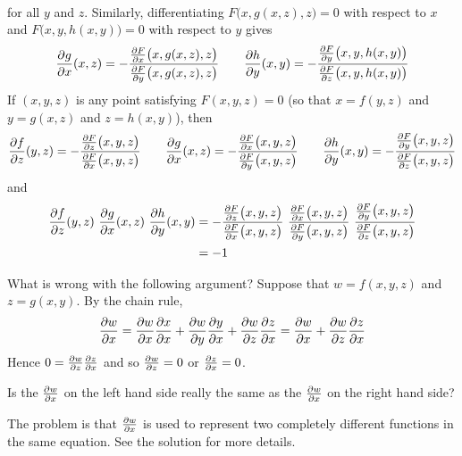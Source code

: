 \begin{solution}
\begin{align*}
\end{align*}
for all $y$ and $z$. Similarly, differentiating 
$F\big(x,g(x,z),z\big)=0$ with respect to $x$ and
$F\big(x,y,h(x,y)\big)=0$ with respect to $y$ gives
\begin{align*}
\pdiff{g}{x}(x,z)
=-\frac{\pdiff{F}{x}\big(x,g(x,z),z\big)}
{\pdiff{F}{y}\big(x,g(x,z),z\big)}\qquad
\pdiff{h}{y}(x,y)
=-\frac{\pdiff{F}{y}\big(x,y,h(x,y)\big)}
{\pdiff{F}{z}\big(x,y,h(x,y)\big)}
\end{align*}
If $(x,y,z)$ is any point satisfying $F(x,y,z)=0$ 
(so that $x=f(y,z)$ and $y=g(x,z)$ and  $z=h(x,y)$), then
\begin{align*}
\pdiff{f}{z}(y,z)
=-\frac{\pdiff{F}{z}\big(x,y,z\big)}
{\pdiff{F}{x}\big(x,y,z\big)}\qquad
\pdiff{g}{x}(x,z)
=-\frac{\pdiff{F}{x}\big(x,y,z\big)}
{\pdiff{F}{y}\big(x,y,z\big)}\qquad
\pdiff{h}{y}(x,y)
=-\frac{\pdiff{F}{y}\big(x,y,z\big)}
{\pdiff{F}{z}\big(x,y,z\big)}
\end{align*}
and
\begin{align*}
\pdiff{f}{z}(y,z)\ 
\pdiff{g}{x}(x,z)\ 
\pdiff{h}{y}(x,y)
&=-\frac{\pdiff{F}{z}\big(x,y,z\big)}
{\pdiff{F}{x}\big(x,y,z\big)}\ 
\frac{\pdiff{F}{x}\big(x,y,z\big)}
{\pdiff{F}{y}\big(x,y,z\big)}\ 
\frac{\pdiff{F}{y}\big(x,y,z\big)} 
{\pdiff{F}{z}\big(x,y,z\big)} \\
&=-1
\end{align*}
\end{solution}


\begin{question}
What is wrong with the following argument? Suppose that $w=f(x,y,z)$
and $z=g(x,y)$. By the chain rule,
\begin{align*}
\pdiff{w}{x}
=\pdiff{w}{x}\pdiff{x}{x}
+\pdiff{w}{y}\pdiff{y}{x}
+\pdiff{w}{z}\pdiff{z}{x}
=\pdiff{w}{x}
+\pdiff{w}{z}\pdiff{z}{x}
\end{align*}
Hence $0=\pdiff{w}{z}\pdiff{z}{x}$
and so $\pdiff{w}{z}=0$
or $\pdiff{z}{x}=0$.
\end{question}

\begin{hint}
Is the $\pdiff{w}{x}$ on the left hand side really
the same as the $\pdiff{w}{x}$ on the right hand side?
\end{hint}

\begin{answer}
The problem is that $\pdiff{w}{x}$ is used to represent
two completely different functions in the same equation.
See the solution for more details.
\end{answer}

